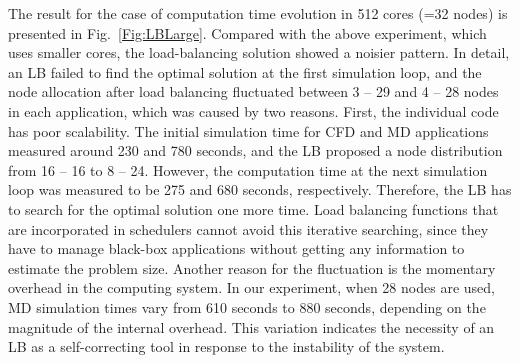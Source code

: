 \documentclass[preprint,12pt]{elsarticle}
\begin{document}
The result for the case of computation time evolution in 512 cores (=32 nodes) is presented in Fig.~\ref{Fig:LBLarge}. Compared with the above experiment, which uses smaller cores, the load-balancing solution showed a noisier pattern. In detail, an LB failed to find the optimal solution at the first simulation loop, and the node allocation after load balancing fluctuated between 3 -- 29 and 4 -- 28 nodes in each application, which was caused by two reasons. First, the individual code has poor scalability. The initial simulation time for CFD and MD applications measured around 230 and 780 seconds, and the LB proposed a node distribution from 16 -- 16 to 8 -- 24. However, the computation time at the next simulation loop was measured to be 275 and 680 seconds, respectively. Therefore, the LB has to search for the optimal solution one more time. Load balancing functions that are incorporated in schedulers cannot avoid this iterative searching, since they have to manage black-box applications without getting any information to estimate the problem size. Another reason for the fluctuation is the momentary overhead in the computing system. In our experiment, when 28 nodes are used, MD simulation times vary from 610 seconds to 880 seconds, depending on the magnitude of the internal overhead. This variation indicates the necessity of an LB as a self-correcting tool in response to the instability of the system.
\end{document}
